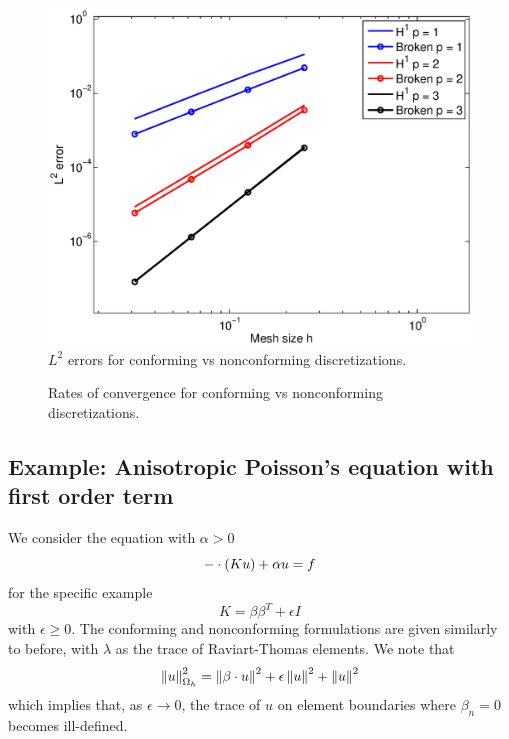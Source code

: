 \documentclass[final,leqno]{siamltex}
\newcommand{\nor}[1]{\left\| #1 \right\|}
\newcommand{\Oh}{\Omega_h}
\let\grad\relax
\newcommand{\grad}{\nabla}
\renewcommand{\div}{\grad \cdot}
\begin{document}
\begin{figure}
\centering
\includegraphics[width=.6\textwidth]{figs/poisson_rates.eps}
  \caption{$L^2$ errors for conforming vs nonconforming discretizations.}
\end{figure}

\begin{figure}
\centering
{}
  \caption{Rates of convergence for conforming vs nonconforming discretizations.}
\end{figure}

\subsection{Example: Anisotropic Poisson's equation with first order term} 

We consider the equation with $\alpha > 0$
\[
-\div(K\grad u) + \alpha u = f
\]
for the specific example 
\[
K = \beta\beta^T + \epsilon I
\]
with $\epsilon \geq 0$.  The conforming and nonconforming formulations are given similarly to before, with $\lambda$ as the trace of Raviart-Thomas elements.  We note that
\[
\nor{u}_{\Oh}^2 = \nor{\beta\cdot\grad u}^2 + \epsilon\nor{\grad u}^2 + \nor{u}^2
\]
which implies that, as $\epsilon\rightarrow 0$, the trace of $u$ on element boundaries where $\beta_n = 0$ becomes ill-defined.  
\end{document}
